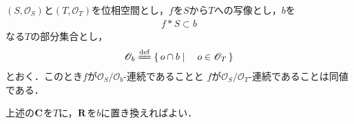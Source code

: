 	\begin{screen}
		\begin{thm}[終域が縮まっても連続]
			$(S,\mathscr{O}_{S})$と$(T,\mathscr{O}_{T})$を位相空間とし，$f$を$S$から$T$への写像とし，$b$を
			\begin{align}
				f \ast S \subset b
			\end{align}
			なる$T$の部分集合とし，
			\begin{align}
				\mathscr{O}_{b} \defeq \Set{o \cap b}{o \in \mathscr{O}_{T}}
			\end{align}
			とおく．このとき$f$が$\mathscr{O}_{S}/\mathscr{O}_{b}$-連続であることと
			$f$が$\mathscr{O}_{S}/\mathscr{O}_{T}$-連続であることは同値である．
		\end{thm}
	\end{screen}
	
	\begin{sketch}
		上述の$\mathbf{C}$を$T$に，$\mathbf{R}$を$b$に置き換えればよい．
		\QED
	\end{sketch}